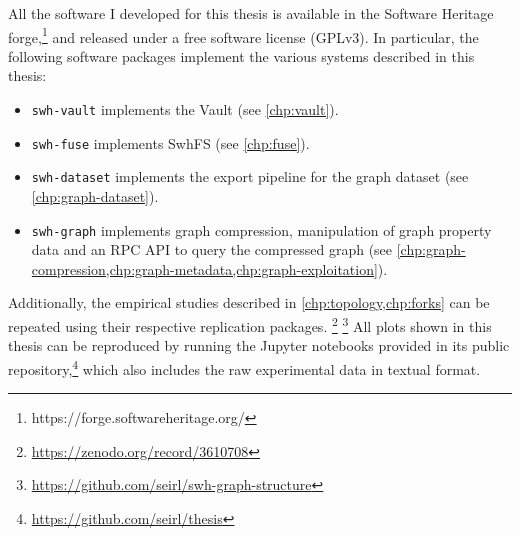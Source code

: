 All the software I developed for this thesis is available in the Software
Heritage forge,\footnote{https://forge.softwareheritage.org/} and released
under a free software license (GPLv3).
In particular, the following software packages implement the various systems
described in this thesis:

\begin{itemize}
    \setlength\itemsep{0em}
    \item \texttt{swh-vault} implements the Vault (see \cref{chp:vault}).
    \item \texttt{swh-fuse} implements SwhFS (see \cref{chp:fuse}).
    \item \texttt{swh-dataset} implements the export pipeline for the graph
        dataset (see \cref{chp:graph-dataset}).
    \item \texttt{swh-graph} implements graph compression, manipulation of
        graph property data and an RPC API to query the compressed
        graph (see
        \cref{chp:graph-compression,chp:graph-metadata,chp:graph-exploitation}).
\end{itemize}

Additionally, the empirical studies described in \cref{chp:topology,chp:forks}
can be repeated using their respective replication
packages.%
\footnote{\url{https://zenodo.org/record/3610708}}%
\footnote{\url{https://github.com/seirl/swh-graph-structure}}
%
All plots shown in this thesis can be reproduced by running the Jupyter
notebooks provided in its public
repository,\footnote{\url{https://github.com/seirl/thesis}}
which also includes the raw experimental data in textual format.
